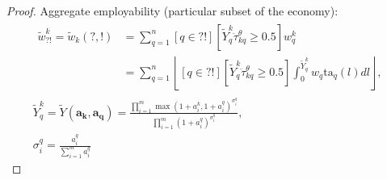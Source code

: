 {\begin{proof}
        Aggregate employability (particular subset of the economy):
        \begin{gather}
            \begin{align}
                \tilde{w}_{?!}^{k} =
                \tilde{w}_{k}(?, !)
                &=
                \sum_{q=1}^{n}{
                    [q \in ?!]
                    [
                        \tilde{Y}_{q}^{k}
                        \ddot{\tau}_{kq}^{\theta}
                        \geq 0.5
                    ]
                    w_{q}^{k}
                }
                \\
                &=
                \sum_{q=1}^{n}{
                    \left\lfloor
                        [q \in ?!]
                        [
                        \tilde{Y}_{q}^{k}
                        \ddot{\tau}_{kq}^{\theta}
                        \geq 0.5
                        ]
                        \int_{0}^{\tilde{Y}_{q}^{k}}{
                            w_q
                            \text{ta}_q(l)
                            dl
                        }
                    \right\rfloor
                }
                ,
            \end{align}
            \\
            \tilde{Y}_{q}^{k} = 
            \tilde{Y}(
                \boldsymbol{a_k},
                \boldsymbol{a_q}
                ) =
                \frac{
                    \prod_{i=1}^{m}{
                        {
                            \max(
                                1 + a_{i}^{k},
                                1 + a_{i}^{q}
                            )
                        } ^ {
                            \sigma_{i}^{q}
                        }
                    }
                }{
                    \prod_{i=1}^{m}{
                        {
                            (
                                1 + a_{i}^{q}
                            )
                        } ^ {
                            \sigma_{i}^{q}
                        }
                    }
                }
                ,\\
                \sigma_{i}^{q} = 
                \frac{
                    a_{i}^{q}
                }{
                    \sum_{i=1}^{m}{
                        a_{i}^{q}
                    }
                }
        \end{gather}
    \end{proof}

}

